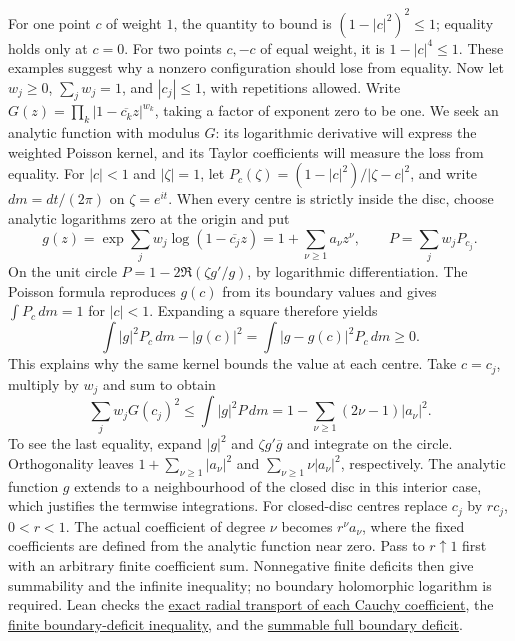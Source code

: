 \documentclass[11pt]{article}
\begin{document}
For one point $c$ of weight $1$, the quantity to bound is
$(1-|c|^2)^2\le1$; equality holds only at $c=0$.
For two points $c,-c$ of equal weight, it is $1-|c|^4\le1$.
These examples suggest why a nonzero configuration should lose from equality.
Now let $w_j\ge0$, $\sum_jw_j=1$, and $|c_j|\le1$, with repetitions allowed.
Write $G(z)=\prod_k|1-\overline{c_k}z|^{w_k}$, taking a factor of
exponent zero to be one. We seek an analytic function with modulus $G$:
its logarithmic derivative will express the weighted Poisson kernel,
and its Taylor coefficients will measure the loss from equality.
For $|c|<1$ and $|\zeta|=1$, let
$P_c(\zeta)=(1-|c|^2)/|\zeta-c|^2$, and write $dm=dt/(2\pi)$ on
$\zeta=e^{it}$. When every centre is strictly inside the disc, choose
analytic logarithms zero at the origin and put
\[
 g(z)=\exp\sum_jw_j\log(1-\overline{c_j}z)
     =1+\sum_{\nu\ge1}a_\nu z^\nu,\qquad
 P=\sum_jw_jP_{c_j}.
\]
On the unit circle $P=1-2\Re(\zeta g'/g)$, by logarithmic
differentiation. The Poisson formula reproduces $g(c)$ from its boundary
values and gives $\int P_c\,dm=1$ for $|c|<1$. Expanding a square therefore
yields
\[
 \int |g|^2P_c\,dm-|g(c)|^2
   =\int |g-g(c)|^2P_c\,dm\ge0.
\]
This explains why the same kernel bounds the value at each centre.
Take $c=c_j$, multiply by $w_j$ and sum to obtain
\[
 \sum_jw_jG(c_j)^2\le\int |g|^2P\,dm
 =1-\sum_{\nu\ge1}(2\nu-1)|a_\nu|^2.
\]
To see the last equality, expand $|g|^2$ and
$\zeta g'\overline g$ and integrate on the circle. Orthogonality leaves
$1+\sum_{\nu\ge1}|a_\nu|^2$ and
$\sum_{\nu\ge1}\nu|a_\nu|^2$, respectively. The analytic function $g$ extends to a neighbourhood of the closed disc
in this interior case,
which justifies the termwise integrations.
For closed-disc centres replace $c_j$ by $rc_j$, $0<r<1$.
The actual coefficient of degree $\nu$ becomes $r^\nu a_\nu$, where the
fixed coefficients are defined from the analytic function near zero.
Pass to $r\uparrow1$ first with an arbitrary finite coefficient sum.
Nonnegative finite deficits then give summability and the infinite inequality;
no boundary holomorphic logarithm is required. Lean checks the
\href{https://github.com/wcook04/plectis-erdos/blob/1d70482583cc9c662cd3b86f66d75c54bb405aa6/lean/ErdosProblems/Erdos1041/WeightedCauchyTransportR10.lean\#L66}{exact radial transport of each Cauchy coefficient},
the
\href{https://github.com/wcook04/plectis-erdos/blob/1d70482583cc9c662cd3b86f66d75c54bb405aa6/lean/ErdosProblems/Erdos1041/WeightedBoundaryDeficitR10.lean\#L108}{finite boundary-deficit inequality},
and the
\href{https://github.com/wcook04/plectis-erdos/blob/1d70482583cc9c662cd3b86f66d75c54bb405aa6/lean/ErdosProblems/Erdos1041/WeightedBoundaryDeficitR10.lean\#L153}{summable full boundary deficit}.
\end{document}
